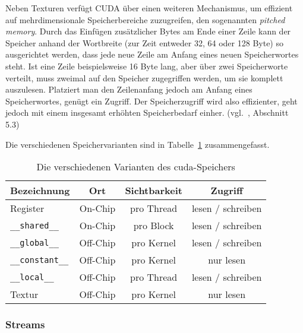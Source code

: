 Neben Texturen verfügt CUDA über einen weiteren Mechanismus, um effizient auf mehrdimensionale Speicherbereiche
zuzugreifen, den sogenannten \textit{pitched memory}. Durch das Einfügen zusätzlicher Bytes am Ende einer Zeile kann
der Speicher anhand der Wortbreite (zur Zeit entweder 32, 64 oder 128 Byte) so ausgerichtet werden, dass jede neue Zeile
am Anfang eines neuen Speicherwortes steht. Ist eine Zeile beispielsweise 16 Byte lang, aber über zwei Speicherworte
verteilt, muss zweimal auf den Speicher zugegriffen werden, um sie komplett auszulesen. Platziert man den Zeilenanfang
jedoch am Anfang eines Speicherwortes, genügt ein Zugriff. Der Speicherzugriff wird also effizienter, geht jedoch mit
einem insgesamt erhöhten Speicherbedarf einher. (vgl.~\cite{cudaprog}, Abschnitt 5.3)

Die verschiedenen Speichervarianten sind in Tabelle~\ref{table:cu_mem_hierarchie} zusammengefasst.

\begin{table}
    \centering
    \begin{tabular}{| l | c | c | c |}
        \hline
        Bezeichnung & Ort & Sichtbarkeit & Zugriff\\
        \hline
        \hline
        Register & On-Chip & pro Thread & lesen / schreiben \\
        \hline
        \texttt{\_\_shared\_\_} & On-Chip & pro Block & lesen / schreiben \\
        \hline
        \texttt{\_\_global\_\_} & Off-Chip & pro Kernel & lesen / schreiben \\
        \hline
        \texttt{\_\_constant\_\_} & Off-Chip & pro Kernel & nur lesen \\
        \hline
        \texttt{\_\_local\_\_} & Off-Chip & pro Thread & lesen / schreiben\\
        \hline
        Textur & Off-Chip & pro Kernel & nur lesen\\
        \hline
    \end{tabular}
    \caption{Die verschiedenen Varianten des \gls{cuda}-Speichers}
    \label{table:cu_mem_hierarchie}
\end{table}

\subsubsection*{Streams}

